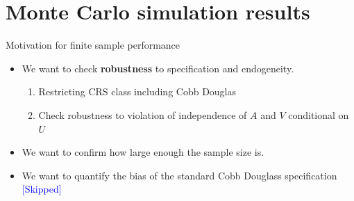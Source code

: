 \documentclass[aspectratio=169]{beamer}
\begin{document}
\section{Monte Carlo simulation results}

\begin{frame}{Motivation for finite sample performance}
\begin{itemize}
    \item We want to check \textbf{robustness} to specification and endogeneity.
    \begin{enumerate}
        \item Restricting CRS class including Cobb Douglas
        \item Check robustness to violation of independence of $A$ and $V$ conditional on $U$
    \end{enumerate}
    \item We want to confirm how large enough the sample size is.
    \item We want to quantify the bias of the standard Cobb Douglass specification \textcolor{blue}{[Skipped]}
\end{itemize}
    
\end{frame}
\end{document}

